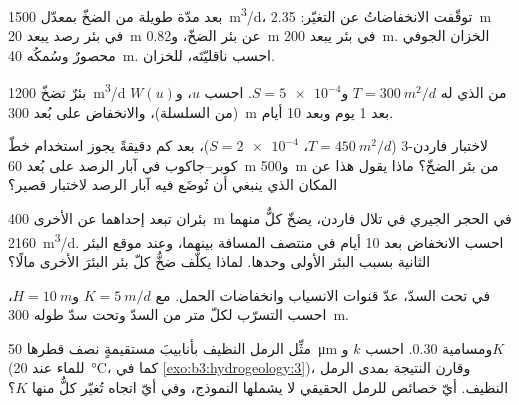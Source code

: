 \begin{exercise}[$\star\star$]\label{exo:b3:hydrogeology:5}
بعد مدّة طويلة من الضخّ بمعدّل \qty{1500}{m^3/d}، توقّفت الانخفاضاتُ عن
التغيّر: \qty{2.35}{m} في بئر رصد يبعد \qty{20}{m} عن
بئر الضخّ، و\qty{0.82}{m} في بئر يبعد \qty{200}{m}. الخزان الجوفي
محصورٌ وسُمكُه \qty{40}{m}. احسب ناقليّتَه،  للخزان.
\end{exercise}

\begin{exercise}[$\star\star$]\label{exo:b3:hydrogeology:6}
بئرٌ تضخّ \qty{1200}{m^3/d} من  الذي له $T =
\qty{300}{m^2/d}$ و$S = \num{5e-4}$. احسب $u$، و$W(u)$ (من
السلسلة)، والانخفاض على بُعد \qty{300}{m} بعد 1 يوم وبعد 10 أيام.
\end{exercise}

\begin{exercise}[$\star\star$]\label{exo:b3:hydrogeology:7}
لاختبار فاردن-3 ($T = \qty{450}{m^2/d}$، $S = \num{2e-4}$)، بعد
كم دقيقةً يجوز استخدام خطّ كوبر--جاكوب في آبار الرصد
على بُعد \qty{60}{m} و\qty{500}{m} من بئر الضخّ؟ ماذا يقول هذا
عن المكان الذي ينبغي أن تُوضَع فيه آبار الرصد لاختبار قصير؟
\end{exercise}

\begin{exercise}[$\star\star$]\label{exo:b3:hydrogeology:8}
بئران تبعد إحداهما عن الأخرى \qty{400}{m} في الحجر الجيري في تلال فاردن، يضخّ كلٌّ منهما
\qty{2160}{m^3/d}. احسب الانخفاض بعد 10 أيام في منتصف المسافة بينهما،
وعند موقع البئر الثانية بسبب البئر الأولى وحدها. لماذا يكلّف ضخُّ كلّ بئر
البئرَ الأخرى مالًا؟
\end{exercise}

\begin{exercise}[$\star\star$]\label{exo:b3:hydrogeology:9}
في  تحت السدّ، عدّ قنوات الانسياب وانخفاضات الحمل.
مع $K = \qty{5}{m/d}$ و$H = \qty{10}{m}$، احسب التسرّب لكلّ
متر من السدّ وتحت سدّ طوله \qty{300}{m}.
\end{exercise}

\begin{exercise}[$\star\star\star$]\label{exo:b3:hydrogeology:10}
مثِّل الرمل النظيف بأنابيبَ مستقيمةٍ نصف قطرها \qty{50}{\micro\metre} ومسامية
0.30. احسب $k$ و$K$ (للماء عند \qty{20}{\celsius}، كما في
\cref{exo:b3:hydrogeology:3})،
وقارن النتيجة بمدى الرمل النظيف. أيّ خصائص للرمل الحقيقي لا يشملها النموذج،
وفي أيّ اتجاه تُغيّر كلٌّ منها $K$؟
\end{exercise}


